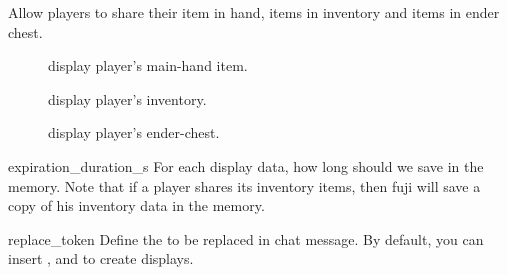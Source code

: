 Allow players to share their item in hand, items in inventory and items in ender chest.

\begin{description}
    \item [] display player's main-hand item.
    \item[] display player's inventory.
    \item[] display player's ender-chest.
\end{description}

\begin{Configuration}
    \item[expiration\_duration\_s]{
        For each display data, how long should we save in the memory.
        Note that if a player shares its inventory items, then fuji will save a copy of his inventory data in the memory.
    }

    \item[replace\_token] {
        Define the  to be replaced in chat message.
        By default, you can insert \str{[item]}, \str{[inv]} and \str{[ender]} to create displays.
    }

\end{Configuration}